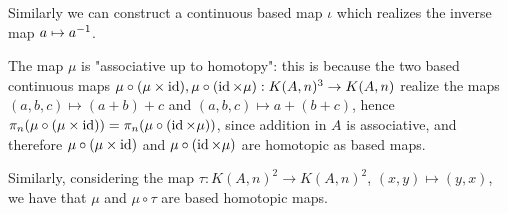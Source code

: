 Similarly we can construct a continuous based map $\iota$ which realizes the inverse map $a\mapsto a^{-1}$.

The map $\mu$ is "associative up to homotopy": this is because the two based continuous maps $\mu\circ(\mu\times\operatorname{id}),\mu\circ(\operatorname{id}\times\mu):K(A,n)^3\to K(A,n)$ realize the maps $(a,b,c)\mapsto(a+b)+c$ and $(a,b,c)\mapsto a+(b+c)$, hence $\pi_n(\mu\circ(\mu\times\operatorname{id}))=\pi_n(\mu\circ(\operatorname{id}\times\mu))$, since addition in $A$ is associative, and therefore $\mu\circ(\mu\times\operatorname{id})$ and $\mu\circ(\operatorname{id}\times\mu)$ are homotopic as based maps.

Similarly, considering the map $\tau:K(A,n)^2\to K(A,n)^2$, $(x,y)\mapsto(y,x)$, we have that $\mu$ and $\mu\circ\tau$ are based homotopic maps.

\ 
